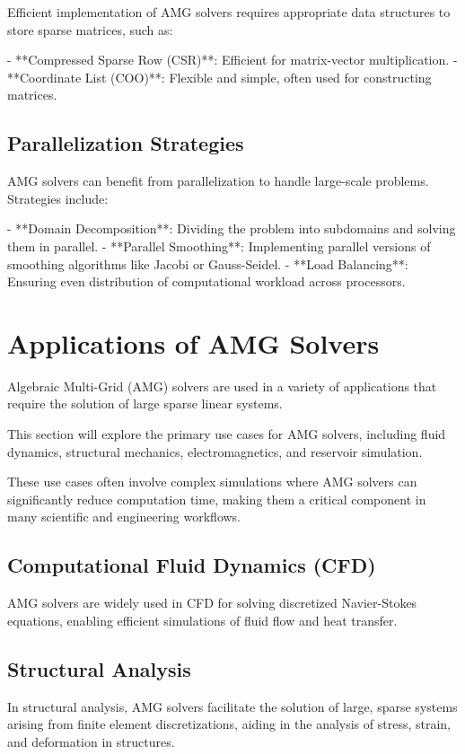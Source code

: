 Efficient implementation of AMG solvers requires appropriate data structures to store sparse matrices, such as:

- **Compressed Sparse Row (CSR)**: Efficient for matrix-vector multiplication.
- **Coordinate List (COO)**: Flexible and simple, often used for constructing matrices.

\subsection{Parallelization Strategies}

AMG solvers can benefit from parallelization to handle large-scale problems. Strategies include:

- **Domain Decomposition**: Dividing the problem into subdomains and solving them in parallel.
- **Parallel Smoothing**: Implementing parallel versions of smoothing algorithms like Jacobi or Gauss-Seidel.
- **Load Balancing**: Ensuring even distribution of computational workload across processors.

\section{Applications of AMG Solvers}

Algebraic Multi-Grid (AMG) solvers are used in a variety of applications that require the solution of large sparse linear systems. 

This section will explore the primary use cases for AMG solvers, including fluid dynamics, structural mechanics, electromagnetics, and reservoir simulation. 

These use cases often involve complex simulations where AMG solvers can significantly reduce computation time, making them a critical component in many scientific and engineering workflows.

\subsection{Computational Fluid Dynamics (CFD)}

AMG solvers are widely used in CFD for solving discretized Navier-Stokes equations, enabling efficient simulations of fluid flow and heat transfer.

\subsection{Structural Analysis}

In structural analysis, AMG solvers facilitate the solution of large, sparse systems arising from finite element discretizations, aiding in the analysis of stress, strain, and deformation in structures.

